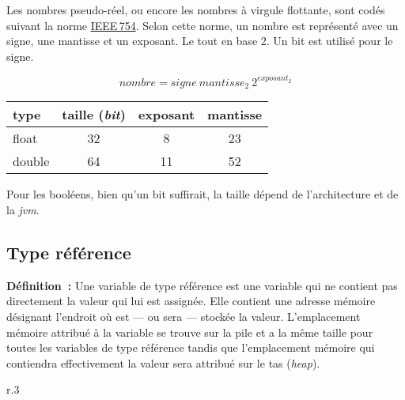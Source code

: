 	Les nombres pseudo-réel, ou encore les nombres à virgule flottante, sont
	codés suivant la norme
	\href{https://fr.wikipedia.org/wiki/IEEE_754}{IEEE\,754}. Selon cette norme,
	un nombre est représenté avec un signe, une mantisse et un exposant. Le tout
	en base 2. Un bit est utilisé pour le signe.  

	\[
		nombre = signe~mantisse_2~2^{exposant_2} 
	\]


	\begin{center}
	\begin{tabular}[t]{|l|c|c|c|}
		\hline
		\rowcolor{black!40}
		type 	& taille (\textit{bit})	& exposant & mantisse\\
		\hline
		float	& 32					& 8		& 23\\
		\hline
		double	& 64					& 11	& 52\\
		\hline
	\end{tabular}
	\end{center}
	
	Pour les booléens, bien qu'un bit suffirait, la taille dépend 
	de l'architecture et de la \textit{jvm}. 
	
	
	
	
	\pagebreak[4]
	\subsection{Type référence}
	
	\textbf{Définition~:} 
	Une variable de type référence est une variable qui ne contient pas
	directement la valeur qui lui est assignée. Elle contient une adresse
	mémoire désignant l'endroit où est — ou sera — stockée la valeur.
	L'emplacement mémoire attribué à la variable se trouve sur la pile et a la
	même taille pour toutes les variables de type référence tandis que
	l'emplacement mémoire qui contiendra effectivement la valeur sera attribué
	sur le tas (\textit{heap}).


	\begin{wrapfigure}{r}{.3\linewidth}
		\begin{center}
		\end{center}
	\end{wrapfigure}
	
